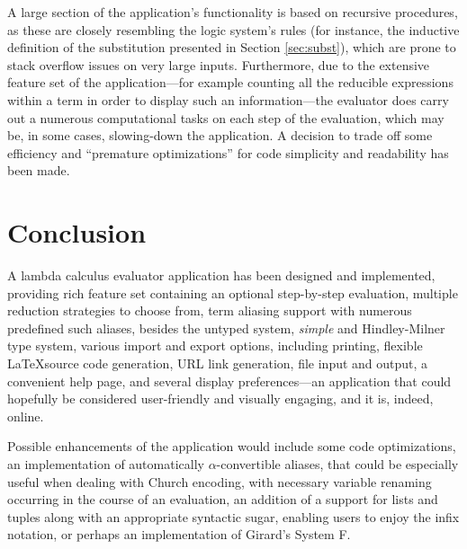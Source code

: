 \documentclass[table, a4paper, 10pt]{book}
\begin{document}
A large section of the application's functionality is based on recursive procedures,
as these are closely resembling the logic system's rules (for instance,
the inductive definition of the substitution presented in Section \ref{sec:subst}),
which are prone to stack overflow issues on very large inputs. Furthermore,
due to the extensive feature set of the application---for
example counting all the reducible expressions within a term in order
to display such an information---the evaluator
does carry out a numerous computational tasks on each step of the evaluation,
which may be, in some cases, slowing-down the application.
A decision to trade off some efficiency and ``premature optimizations'' for code
simplicity and readability has been made.

\newpage
\chapter{Conclusion}
A lambda calculus evaluator application has been designed and implemented,
providing rich feature set containing an optional step-by-step evaluation,
multiple reduction strategies to choose from, term aliasing support with numerous predefined such aliases,
besides the untyped system, \textit{simple} and Hindley-Milner type system,
various import and export options, including printing, flexible \LaTeX\;source code generation,
URL link generation, file input and output, a convenient help page,
and several display preferences---an application that could hopefully be considered user-friendly
and visually engaging,
and it is, indeed, online.

Possible enhancements of the application would include some code optimizations, an implementation
of automatically $\alpha$-convertible aliases, that could be especially useful 
when dealing with Church encoding, with necessary variable renaming occurring in the course of an
evaluation, an addition of a support for lists and tuples along with an appropriate syntactic sugar,
enabling users to enjoy the infix notation,
or perhaps an implementation of Girard's System F.

\appendix
\end{document}
